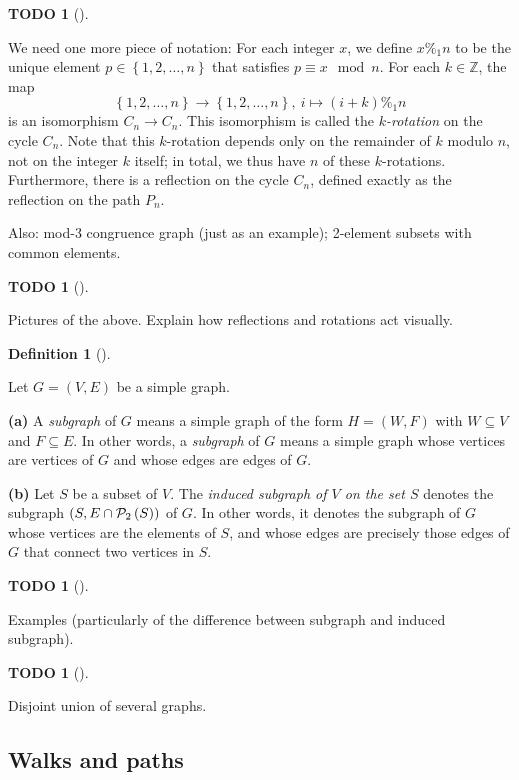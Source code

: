 \documentclass[numbers=enddot,12pt,final,onecolumn,notitlepage]{scrartcl}%
\theoremstyle{definition}
\newtheorem{defi}[theo]{Definition}
\newenvironment{definition}[1][]
{\begin{defi}[#1]\begin{leftbar}}
{\end{leftbar}\end{defi}}
\newtheorem{quest}[theo]{TODO}
\newenvironment{todo}[1][]
{\begin{quest}[#1]\begin{leftbar}}
{\end{leftbar}\end{quest}}
\newcommand{\ZZ}{\mathbb{Z}}
\newcommand{\powset}[2][]{\ifthenelse{\equal{#2}{}}{\mathcal{P}\left(#1\right)}{\mathcal{P}_{#1}\left(#2\right)}}
\newcommand{\set}[1]{\left\{ #1 \right\}}
\newcommand{\tup}[1]{\left( #1 \right)}
\begin{document}
\begin{todo}
\begin{itemize}
We need one more piece of notation: For each integer $x$, we define
$x \%_1 n$ to be the unique element $p \in \set{1,2,\ldots,n}$
that satisfies $p \equiv x \mod n$.
For each $k \in \ZZ$, the map
\[
\set{1,2,\ldots,n} \to \set{1,2,\ldots,n},
\ i \mapsto \tup{i+k} \%_1 n
\]
is an isomorphism $C_n \to C_n$. This isomorphism is called the
\textit{$k$-rotation} on the cycle $C_n$. Note that this $k$-rotation
depends only on the remainder of $k$ modulo $n$, not on the integer
$k$ itself; in total, we thus have $n$ of these $k$-rotations.
Furthermore, there is a reflection on the cycle $C_n$, defined exactly
as the reflection on the path $P_n$.
\end{itemize}
Also:
mod-3 congruence graph (just as an example);
2-element subsets with common elements.
\end{todo}

\begin{todo}
Pictures of the above. Explain how reflections and rotations act
visually.
\end{todo}

\begin{definition} \label{def.intro.subgraph}
Let $G = \tup{V, E}$ be a simple graph.

\textbf{(a)} A \textit{subgraph} of $G$ means a simple graph of the
form $H = \tup{W, F}$ with $W \subseteq V$ and $F \subseteq E$. In
other words, a \textit{subgraph} of $G$ means a simple graph whose
vertices are vertices of $G$ and whose edges are edges of $G$.

\textbf{(b)} Let $S$ be a subset of $V$. The \textit{induced subgraph
of $V$ on the set $S$} denotes the subgraph
$\tup{S, E \cap \powset[2]{S}}$ of $G$. In other words, it denotes
the subgraph of $G$ whose vertices are the elements of $S$, and whose
edges are precisely those edges of $G$ that connect two vertices in
$S$.
\end{definition}

\begin{todo}
Examples (particularly of the difference between subgraph and
induced subgraph).
\end{todo}

\begin{todo}
Disjoint union of several graphs.
\end{todo}

\subsection{\label{sect.intro.walks}Walks and paths}
\end{document}
